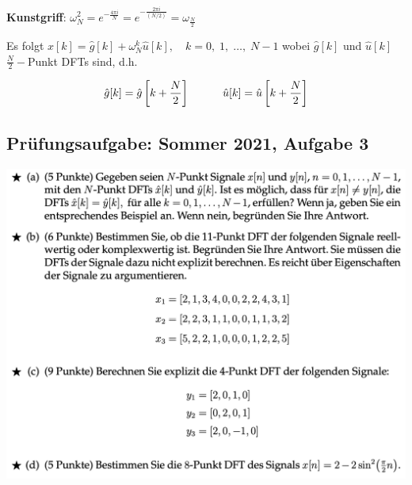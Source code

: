 \documentclass[11pt]{article}
\begin{document}
\vspace*{-0.5cm}
\textbf{Kunstgriff}: $\omega_N^2 = e^{-\frac{4 \pi i}{N}} = e^{-\frac{2 \pi i}{(N/2)}} = \omega_{\frac{N}{2}}$

\vspace*{-0.25cm}

Es folgt $\hat{x}[k] = \hat{g}[k] + \omega_N^k \hat{u}[k], \hspace{12pt} k = 0, \; 1, \; \dots, \; N-1$ wobei $\hat{g}[k]$ und $\hat{u}[k]$ $\frac{N}{2}-$Punkt DFTs sind, d.h.

\vspace*{-0.75cm}
$$\hat{g}[k] = \hat{g}\left[k + \frac{N}{2}\right] \hspace*{30pt} \hat{u}[k] = \hat{u}\left[k + \frac{N}{2}\right]$$

\subsection*{Prüfungsaufgabe: Sommer 2021, Aufgabe 3}
\vspace*{-0.5cm}
\includegraphics[width=0.95\linewidth]{docimgs/Sommer21_3.png}

\pagebreak

\end{document}
